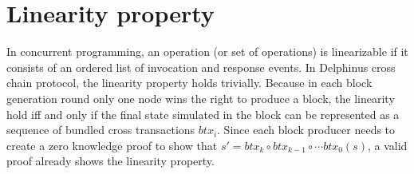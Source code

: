 \documentclass[pageno]{jpaper}
\begin{document}
\section{Linearity property}
In concurrent programming, an operation (or set of operations) is linearizable if it consists of an ordered list of invocation and response events. In Delphinus cross chain protocol, the linearity property holds trivially. Because in each block generation round only one node wins the right to produce a block, the linearity hold iff and only if the final state simulated in the block can be represented as a sequence of bundled cross transactions $btx_i$. Since each block producer needs to create a zero knowledge proof to show that $s' = btx_k \circ btx_{k-1} \circ \cdots btx_0(s)$, a valid proof already shows the linearity property.



\end{document}
